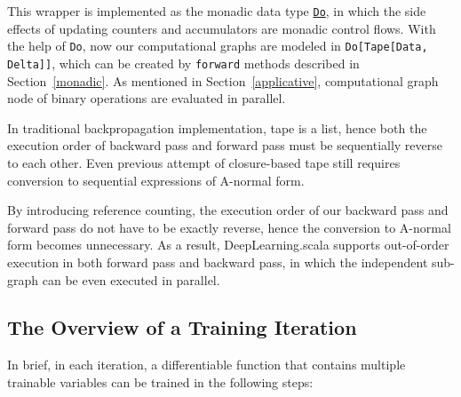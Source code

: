 This wrapper is implemented as the monadic data type \href{https://javadoc.io/page/com.thoughtworks.raii/asynchronous_2.11/latest/com/thoughtworks/raii/asynchronous%24%24Do.html}{\lstinline{Do}}, in which the side effects of updating counters and accumulators are monadic control flows. With the help of \lstinline{Do}, now our \glspl{computational graph} are modeled in \lstinline{Do[Tape[Data, Delta]]}, which can be created by \lstinline{forward} methods described in Section~\ref{monadic}. As mentioned in Section~\ref{applicative}, \gls{computational graph} node of binary operations are evaluated in parallel.

In traditional backpropagation implementation, tape is a list, hence both the execution order of backward pass and forward pass must be sequentially reverse to each other. Even previous attempt of closure-based tape\cite{pearlmutter2008reverse} still requires conversion to sequential expressions of A-normal form\cite{sabry1993reasoning}. 

By introducing reference counting, the execution order of our backward pass and forward pass do not have to be exactly reverse, hence the conversion to A-normal form becomes unnecessary. As a result, DeepLearning.scala supports out-of-order execution in both forward pass and backward pass, in which the independent sub-graph can be even executed in parallel.

\subsection{The Overview of a Training Iteration}
\label{training iteration}

In brief, in each iteration, a \gls{differentiable function} that contains multiple \glspl{trainable variable} can be trained in the following steps:

